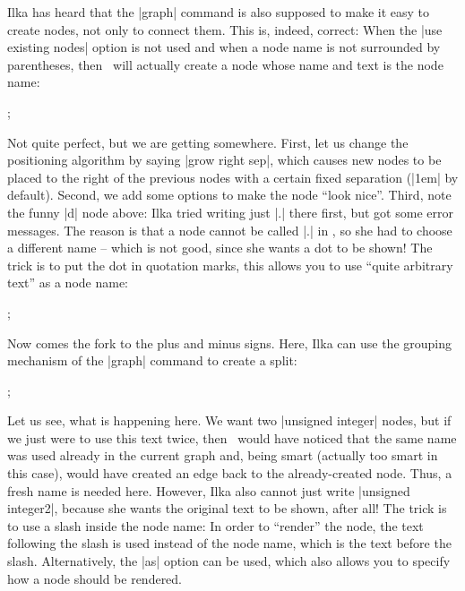 Ilka has heard that the |graph| command is also supposed to make it easy to
create nodes, not only to connect them. This is, indeed, correct: When the
|use existing nodes| option is not used and when a node name is not surrounded
by parentheses, then \tikzname\ will actually create a node whose name and text
is the node name:
%
\begin{codeexample}[preamble={\usetikzlibrary{graphs}}]
\tikz {};
\end{codeexample}
%
Not quite perfect, but we are getting somewhere. First, let us change the
positioning algorithm by saying |grow right sep|, which causes new nodes to be
placed to the right of the previous nodes with a certain fixed separation
(|1em| by default). Second, we add some options to make the node ``look nice''.
Third, note the funny |d| node above: Ilka tried writing just |.| there first,
but got some error messages. The reason is that a node cannot be called |.| in
\tikzname, so she had to choose a different name -- which is not good, since
she wants a dot to be shown! The trick is to put the dot in quotation marks,
this allows you to use ``quite arbitrary text'' as a node name:
%
\begin{codeexample}[preamble={\usetikzlibrary{graphs,shapes.misc}}]
\tikz {};
\end{codeexample}
%
Now comes the fork to the plus and minus signs. Here, Ilka can use the grouping
mechanism of the |graph| command to create a split:
%
\begin{codeexample}[preamble={\usetikzlibrary{graphs,shapes.misc}}]
\tikz {};
\end{codeexample}
%
Let us see, what is happening here. We want two |unsigned integer| nodes, but
if we just were to use this text twice, then \tikzname\ would have noticed that
the same name was used already in the current graph and, being smart (actually
too smart in this case), would have created an edge back to the already-created
node. Thus, a fresh name is needed here. However, Ilka also cannot just write
|unsigned integer2|, because she wants the original text to be shown, after
all! The trick is to use a slash inside the node name: In order to ``render''
the node, the text following the slash is used instead of the node name, which
is the text before the slash. Alternatively, the |as| option can be used, which
also allows you to specify how a node should be rendered.

